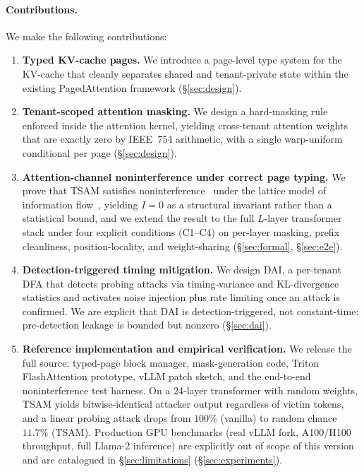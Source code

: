 \documentclass[11pt]{article}
\begin{document}
\paragraph{Contributions.}
We make the following contributions:
\begin{enumerate}[leftmargin=*,itemsep=2pt]
\item \textbf{Typed KV-cache pages.} We introduce a page-level type
  system for the KV-cache that cleanly separates shared and
  tenant-private state within the existing PagedAttention framework
  (\S\ref{sec:design}).

\item \textbf{Tenant-scoped attention masking.} We design a hard-masking
  rule enforced inside the attention kernel, yielding cross-tenant
  attention weights that are exactly zero by IEEE~754 arithmetic, with a
  single warp-uniform conditional per page (\S\ref{sec:design}).

\item \textbf{Attention-channel noninterference under correct page typing.}
  We prove that TSAM satisfies noninterference~\citep{goguen1982security}
  under the lattice model of information flow~\citep{denning1976lattice,
  sabelfeld2003language}, yielding $I = 0$ as a structural invariant
  rather than a statistical bound, and we extend the result to the full
  $L$-layer transformer stack under four explicit conditions (C1--C4)
  on per-layer masking, prefix cleanliness, position-locality, and
  weight-sharing (\S\ref{sec:formal}, \S\ref{sec:e2e}).

\item \textbf{Detection-triggered timing mitigation.} We design DAI, a
  per-tenant DFA that detects probing attacks via timing-variance and
  KL-divergence statistics and activates noise injection plus rate
  limiting once an attack is confirmed.  We are explicit that DAI is
  detection-triggered, not constant-time: pre-detection leakage is
  bounded but nonzero (\S\ref{sec:dai}).

\item \textbf{Reference implementation and empirical verification.} We
  release the full source: typed-page block manager, mask-generation
  code, Triton FlashAttention prototype, vLLM patch sketch, and the
  end-to-end noninterference test harness.  On a 24-layer transformer
  with random weights, TSAM yields bitwise-identical attacker output
  regardless of victim tokens, and a linear probing attack drops from
  $100\%$ (vanilla) to random chance $11.7\%$ (TSAM).
  Production GPU benchmarks (real vLLM fork, A100/H100 throughput,
  full Llama-2 inference) are explicitly out of scope of this version
  and are catalogued in \S\ref{sec:limitations} (\S\ref{sec:experiments}).
\end{enumerate}
\end{document}
